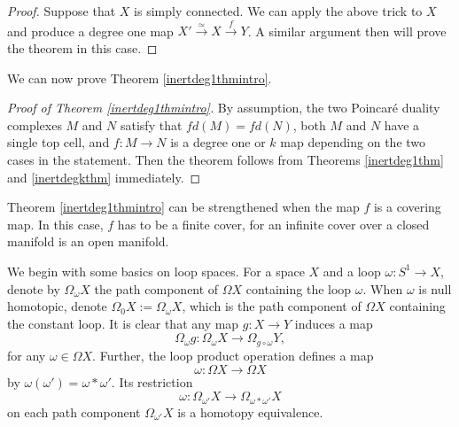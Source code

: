 \documentclass[a4]{amsart}
\theoremstyle{definition}
\begin{document}
\begin{sloppypar}
\begin{proof}
Suppose that $X$ is simply connected. We can apply the above trick to $X$ and produce a degree one map $X'\stackrel{\simeq}{\longrightarrow} X\stackrel{f}{\longrightarrow} Y$. A similar argument then will prove the theorem in this case. 
\end{proof}

We can now prove Theorem \ref{inertdeg1thmintro}. 

\begin{proof}[Proof of Theorem \ref{inertdeg1thmintro}]
By assumption, the two Poincar\'{e} duality complexes $M$ and $N$ satisfy that $fd(M)=fd(N)$, both $M$ and $N$ have a single top cell, and $f: M\stackrel{}{\longrightarrow} N$ is a degree one or $k$ map depending on the two cases in the statement. Then the theorem follows from Theorems \ref{inertdeg1thm} and \ref{inertdegkthm} immediately. 
\end{proof}

Theorem \ref{inertdeg1thmintro} can be strengthened when the map $f$ is a covering map. In this case, $f$ has to be a finite cover, for an infinite cover over a closed manifold is an open manifold.  

We begin with some basics on loop spaces. 
For a space $X$ and a loop $\omega: S^1\stackrel{}{\longrightarrow} X$, denote by $\Omega_\omega X$ the path component of $\Omega X$ containing the loop $\omega$. When $\omega$ is null homotopic, denote $\Omega_0 X:=\Omega_\omega X$, which is the path component of $\Omega X$ containing the constant loop.
It is clear that any map $g: X\stackrel{}{\longrightarrow} Y$ induces a map 
\[
\Omega_\omega g: \Omega_\omega X\stackrel{}{\longrightarrow} \Omega_{g\circ \omega} Y,
\]
for any $\omega \in \Omega X$. Further, the loop product operation defines a map
\[
\omega: \Omega X\stackrel{}{\longrightarrow}\Omega X
\]
by $\omega (\omega')=\omega\ast \omega'$. Its restriction
\[
\omega: \Omega_{\omega'} X\stackrel{}{\longrightarrow}\Omega_{\omega\ast \omega'} X 
\]
on each path component $\Omega_{\omega'} X$ is a homotopy equivalence. 


\end{sloppypar}
\end{document}
